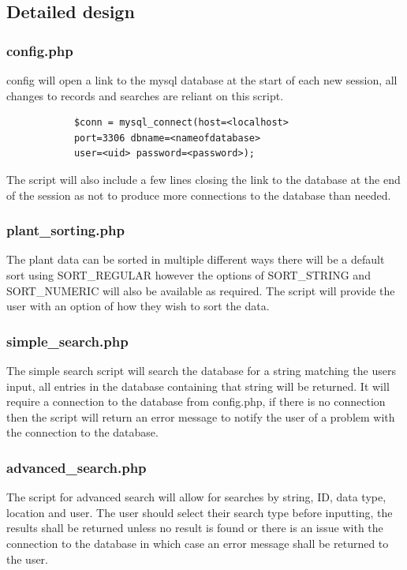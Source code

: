 \subsection{Detailed design}

	\subsubsection{config.php}
		config will open a link to the mysql database at the start of each new session, all changes to records and searches are reliant on this script.
		\begin{verbatim}
			$conn = mysql_connect(host=<localhost> 
			port=3306 dbname=<nameofdatabase> 
			user=<uid> password=<password>);
		\end{verbatim}
		The script will also include a few lines closing the link to the database at the end of the session as not to produce more connections to the database than needed.

	\subsubsection{plant\_sorting.php}
		The plant data can be sorted in multiple different ways there will be a default sort using SORT\_REGULAR however the options of SORT\_STRING and SORT\_NUMERIC will also be available as required. The script will provide the user with an option of how they wish to sort the data.

	\subsubsection{simple\_search.php}
		The simple search script will search the database for a string matching the users input, all entries in the database containing that string will be returned. It will require a connection to the database from config.php, if there is no connection then the script will return an error message to notify the user of a problem with the connection to the database.

	\subsubsection{advanced\_search.php}
		The script for advanced search will allow for searches by string, ID, data type, location and user. The user should select their search type before inputting, the results shall be returned unless no result is found or there is an issue with the connection to the database in which case an error message shall be returned to the user. 

